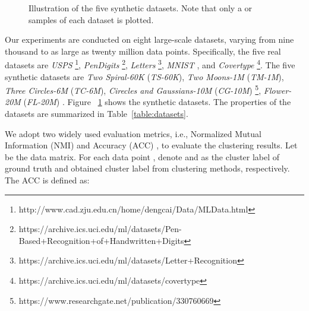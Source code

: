 \documentclass[a4paper,fleqn]{cas-dc}
\begin{document}
\begin{figure}\begin{center}
    {}
    {}
    {}
    {}
    {}
    \caption{Illustration of the five synthetic datasets. Note that only a  or  samples of each dataset is plotted.}
    \label{fig:fiveSynDS}
  \end{center}
\end{figure}

Our experiments are conducted on eight large-scale datasets, varying from nine thousand to as large as twenty million data points. Specifically, the five real datasets are \emph{USPS} \cite{cai2010graph} \footnote{\label{cai_deng_data} http://www.cad.zju.edu.cn/home/dengcai/Data/MLData.html}, \emph{PenDigits} \cite{asuncion2007uci} \footnote{https://archive.ics.uci.edu/ml/datasets/Pen-Based+Recognition+of+Handwritten+Digits}, \emph{Letters} \cite{frey1991letter} \footnote{https://archive.ics.uci.edu/ml/datasets/Letter+Recognition}, \emph{MNIST} \cite{cai2011speed} , and \emph{Covertype} \cite{blackard1999comparative} \footnote{https://archive.ics.uci.edu/ml/datasets/covertype}. The five synthetic datasets are \emph{Two Spiral-60K} (\emph{TS-60K}), \emph{Two
  Moons-1M} (\emph{TM-1M}), \emph{Three Circles-6M} (\emph{TC-6M}), \emph{Cirecles and Gaussians-10M} (\emph{CG-10M}) \cite{huang2019ultra} \footnote{\label{huang}https://www.researchgate.net/publication/330760669}, \emph{Flower-20M} (\emph{FL-20M}) \cite{huang2019ultra} . Figure ~\ref{fig:fiveSynDS} shows the synthetic datasets.
The properties of the datasets are summarized in Table~\ref{table:datasets}.

We adopt two widely used evaluation metrics, i.e., Normalized Mutual Information (NMI) \cite{slonim2000agglomerative} and Accuracy (ACC) \cite{yan2009fast}, to evaluate the clustering results.
Let  be the data matrix. For each data point , denote  and  as the cluster label of ground truth and obtained cluster label from clustering methods, respectively. The ACC is defined as:
\end{document}
